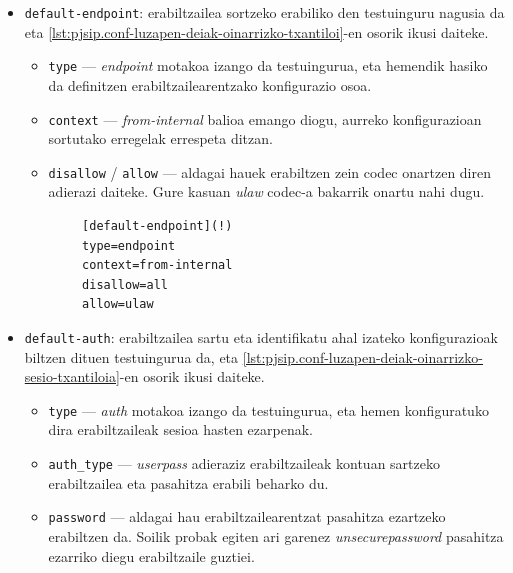 \begin{itemize}
    \item \texttt{default-endpoint}: erabiltzailea sortzeko erabiliko den testuinguru nagusia da eta \autoref{lst:pjsip.conf-luzapen-deiak-oinarrizko-txantiloi}-en osorik ikusi daiteke.
    \begin{itemize}
        \item \texttt{type} --- \textit{endpoint} motakoa izango da testuingurua, eta hemendik hasiko da definitzen erabiltzailearentzako konfigurazio osoa.
        \item \texttt{context} --- \textit{from-internal} balioa emango diogu, aurreko konfigurazioan sortutako erregelak errespeta ditzan.
        \item \texttt{disallow} / \texttt{allow} --- aldagai hauek erabiltzen zein codec onartzen diren adierazi daiteke. Gure kasuan \textit{ulaw} codec-a bakarrik onartu nahi dugu.
    \end{itemize}
    \begin{listing}
        \begin{verbatim}
        [default-endpoint](!)
        type=endpoint
        context=from-internal
        disallow=all
        allow=ulaw
        \end{verbatim}
        \caption{Luzapen telefonikoen oinarrizko konfigurazio txantiloia deientzako pjsip.conf konfigurazio fitxategian}
        \label{lst:pjsip.conf-luzapen-deiak-oinarrizko-txantiloi}
    \end{listing}
    \item \texttt{default-auth}: erabiltzailea sartu eta identifikatu ahal izateko konfigurazioak biltzen dituen testuingurua da, eta \autoref{lst:pjsip.conf-luzapen-deiak-oinarrizko-sesio-txantiloia}-en osorik ikusi daiteke.
    \begin{itemize}
        \item \texttt{type} --- \textit{auth} motakoa izango da testuingurua, eta hemen konfiguratuko dira erabiltzaileak sesioa hasten ezarpenak.
        \item \texttt{auth_type} --- \textit{userpass} adieraziz erabiltzaileak kontuan sartzeko erabiltzailea eta pasahitza erabili beharko du.
        \item \texttt{password} --- aldagai hau erabiltzailearentzat pasahitza ezartzeko erabiltzen da. Soilik probak egiten ari garenez \textit{unsecurepassword} pasahitza ezarriko diegu erabiltzaile guztiei. 
    \end{itemize}

\end{itemize}
